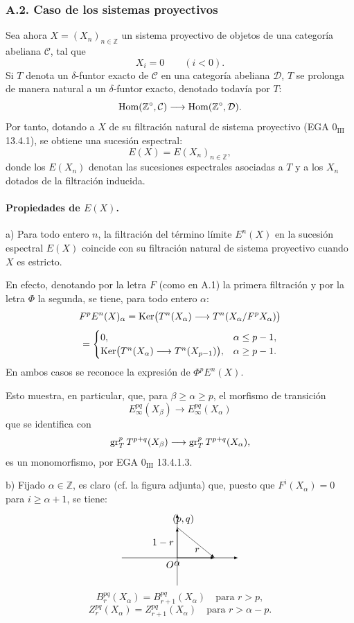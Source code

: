 \subsubsection*{A.2. Caso de los sistemas proyectivos}
Sea ahora \(X=(X_n)_{n\in\mathbb Z}\) un sistema proyectivo de objetos de una categoría abeliana \(\mathcal C\), tal que
\[
X_i=0\qquad(i<0).
\]
Si \(T\) denota un \(\delta\)-funtor exacto de \(\mathcal C\) en una categoría abeliana \(\mathcal D\), \(T\) se prolonga de manera natural a un \(\delta\)-funtor exacto, denotado todavía por \(T\):
\[
\operatorname{Hom}(\mathbb Z^\circ,\mathcal C)\longrightarrow \operatorname{Hom}(\mathbb Z^\circ,\mathcal D).
\]
Por tanto, dotando a \(X\) de su filtración natural de sistema proyectivo (EGA \(0_{\mathrm{III}}\) 13.4.1), se obtiene una sucesión espectral:
\[
E(X)=E(X_n)_{n\in\mathbb Z},
\]
donde los \(E(X_n)\) denotan las sucesiones espectrales asociadas a \(T\) y a los \(X_n\) dotados de la filtración inducida.

\paragraph{Propiedades de \(E(X)\).}
a) Para todo entero \(n\), la filtración del término límite \(E^n(X)\) en la sucesión espectral \(E(X)\) coincide con su filtración natural de sistema proyectivo cuando \(X\) es estricto.

En efecto, denotando por la letra \(F\) (como en A.1) la primera filtración y por la letra \(\Phi\) la segunda, se tiene, para todo entero \(\alpha\):
\[
F^pE^n(X)_\alpha
=\operatorname{Ker}\bigl(T^n(X_\alpha)\longrightarrow T^n(X_\alpha/F^pX_\alpha)\bigr)
\]
\[
=
\begin{cases}
0,& \alpha\le p-1,\\
\operatorname{Ker}\bigl(T^n(X_\alpha)\longrightarrow T^n(X_{p-1})\bigr),& \alpha\ge p-1.
\end{cases}
\]
En ambos casos se reconoce la expresión de \(\Phi^pE^n(X)\).

Esto muestra, en particular, que, para \(\beta\ge\alpha\ge p\), el morfismo de transición
\[
E_\infty^{pq}(X_\beta)\longrightarrow E_\infty^{pq}(X_\alpha)
\]
que se identifica con
\[
\operatorname{gr}_T^pT^{p+q}(X_\beta)\longrightarrow
\operatorname{gr}_T^pT^{p+q}(X_\alpha),
\]
es un monomorfismo, por EGA \(0_{\mathrm{III}}\) 13.4.1.3.

b) Fijado \(\alpha\in\mathbb Z\), es claro (cf. la figura adjunta) que, puesto que \(F^i(X_\alpha)=0\) para \(i\ge\alpha+1\), se tiene:
\[
\begin{tikzpicture}[baseline=(current bounding box.center),x=1.0cm,y=1.0cm,>=latex]
\draw[->] (-2.0,0) -- (2.2,0);
\draw[->] (0,-1.0) -- (0,1.6);
\node[below left] at (0,0) {$O$};
\node[below] at (0,0) {$\alpha$};
\draw[->] (0,0) -- (0,1.1);
\draw[->] (0,1.1) -- (1.35,0);
\draw[->] (0,0) -- (1.35,0);
\node[above] at (.22,1.1) {$(p,q)$};
\node[left] at (0,0.55) {$1-r$};
\node[above] at (.72,0.08) {$r$};
\end{tikzpicture}
\]
\[
B_r^{pq}(X_\alpha)=B_{r+1}^{pq}(X_\alpha)\quad\text{para }r>p,
\]
\[
Z_r^{pq}(X_\alpha)=Z_{r+1}^{pq}(X_\alpha)\quad\text{para }r>\alpha-p.
\]

